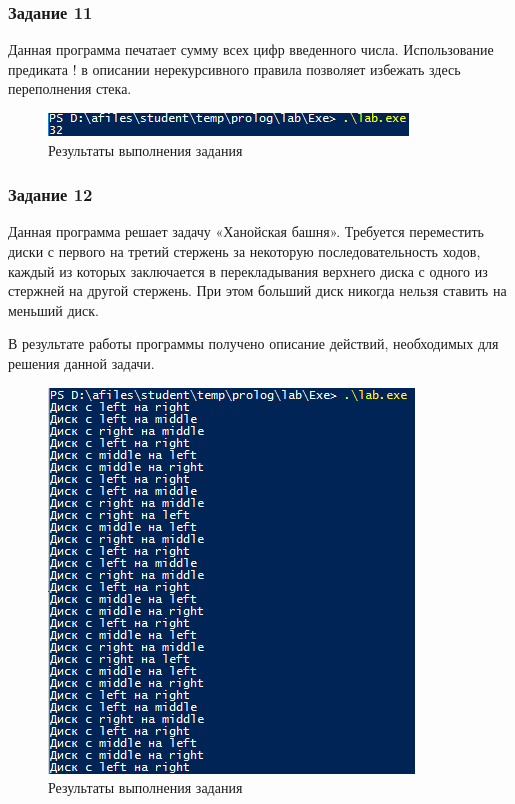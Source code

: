 \documentclass[14pt,a4paper,report]{report}
\begin{document}
\subsubsection{Задание 11}

Данная программа печатает сумму всех цифр введенного числа. Использование предиката ! в описании нерекурсивного правила позволяет избежать здесь переполнения стека.



\begin{figure}[h!]
	\centering
	\includegraphics[scale = 1.0]{images/d11.png}
	\caption{Результаты выполнения задания}
\end{figure}

\subsubsection{Задание 12}

Данная программа решает задачу «Ханойская башня». Требуется переместить диски с первого на третий стержень за некоторую последовательность ходов, каждый из которых заключается в перекладывания верхнего диска с одного из стержней на другой стержень. При этом больший диск никогда нельзя ставить на меньший диск.

В результате работы программы получено описание действий, необходимых для решения данной задачи.



\begin{figure}[h!]
	\centering
	\includegraphics[scale = 1.0]{images/d12.png}
	\caption{Результаты выполнения задания}
\end{figure}
\end{document}
